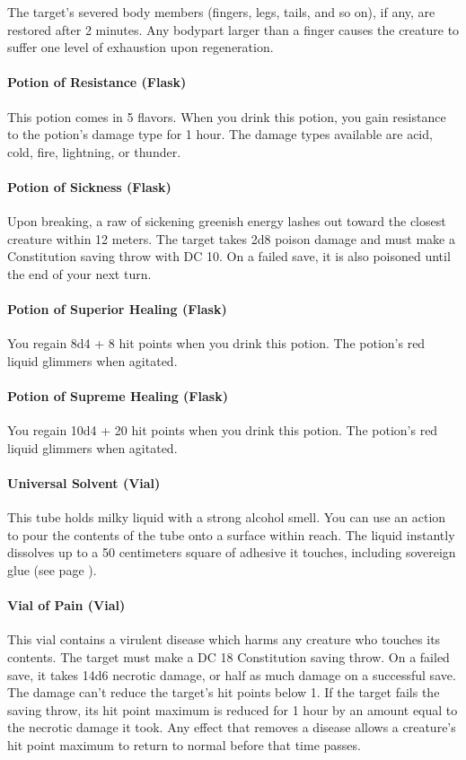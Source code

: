         The target's severed body members (fingers, legs, tails, and so on), if any, are restored after 2 minutes.
        Any bodypart larger than a finger causes the creature to suffer one level of exhaustion upon regeneration.
    \paragraph{Potion of Resistance (Flask)}
        This potion comes in 5 flavors.
        When you drink this potion, you gain resistance to the potion's damage type for 1 hour.
        The damage types available are acid, cold, fire, lightning, or thunder.
    \paragraph{Potion of Sickness (Flask)} %
        Upon breaking, a raw of sickening greenish energy lashes out toward the closest creature within 12 meters.
        The target takes 2d8 poison damage and must make a Constitution saving throw with DC 10.
        On a failed save, it is also poisoned until the end of your next turn.
    \paragraph{Potion of Superior Healing (Flask)}
        You regain 8d4 + 8 hit points when you drink this potion. The potion's red liquid glimmers when agitated.
    \paragraph{Potion of Supreme Healing (Flask)}
        You regain 10d4 + 20 hit points when you drink this potion.
        The potion's red liquid glimmers when agitated.
    \paragraph{Universal Solvent (Vial)} \label{item::universalsolvent}
        This tube holds milky liquid with a strong alcohol smell.
        You can use an action to pour the contents of the tube onto a surface within reach.
        The liquid instantly dissolves up to a 50 centimeters square of adhesive it touches, including sovereign glue (see page \pageref{item::sovereignglue}).
    \paragraph{Vial of Pain (Vial)} %
        This vial contains a virulent disease which harms any creature who touches its contents.
        The target must make a DC 18 Constitution saving throw.
        On a failed save, it takes 14d6 necrotic damage, or half as much damage on a successful save.
        The damage can't reduce the target's hit points below 1.
        If the target fails the saving throw, its hit point maximum is reduced for 1 hour by an amount equal to the necrotic damage it took.
        Any effect that removes a disease allows a creature's hit point maximum to return to normal before that time passes.
\newpage
